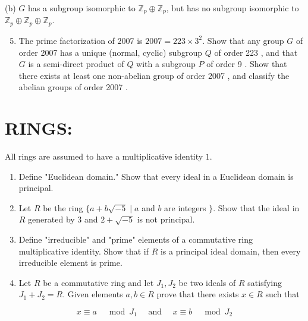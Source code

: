 \documentclass[10pt]{article}
\begin{document}
(b) $G$ has a subgroup isomorphic to $\mathbb{Z}_{p} \oplus \mathbb{Z}_{p}$, but has no subgroup isomorphic to $\mathbb{Z}_{p} \oplus \mathbb{Z}_{p} \oplus \mathbb{Z}_{p}$.

\begin{enumerate}
  \setcounter{enumi}{4}
  \item The prime factorization of 2007 is $2007=223 \times 3^{2}$. Show that any group $G$ of order 2007 has a unique (normal, cyclic) subgroup $Q$ of order 223 , and that $G$ is a semi-direct product of $Q$ with a subgroup $P$ of order 9 . Show that there exists at least one non-abelian group of order 2007 , and classify the abelian groups of order 2007 .
\end{enumerate}
\section{RINGS:}
All rings are assumed to have a multiplicative identity $1 .$

\begin{enumerate}
  \item Define "Euclidean domain." Show that every ideal in a Euclidean domain is principal.

  \item Let $R$ be the ring $\{a+b \sqrt{-5} \mid a$ and $b$ are integers $\}$. Show that the ideal in $R$ generated by 3 and $2+\sqrt{-5}$ is not principal.

  \item Define "irreducible" and "prime" elements of a commutative ring multiplicative identity. Show that if $R$ is a principal ideal domain, then every irreducible element is prime.

  \item Let $R$ be a commutative ring and let $J_{1}, J_{2}$ be two ideals of $R$ satisfying $J_{1}+J_{2}=R$. Given elements $a, b \in R$ prove that there exists $x \in R$ such that

\end{enumerate}
$$
x \equiv a \quad \bmod J_{1} \quad \text { and } \quad x \equiv b \quad \bmod J_{2}
$$
\end{document}
